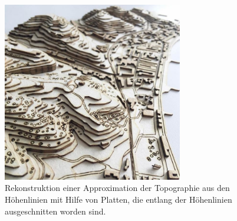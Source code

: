 %
%
%
\begin{figure}
\centering
\includegraphics[width=0.7\textwidth]{chapters/120-topologie/images/relief.jpg}
\caption{Rekonstruktion einer Approximation der Topographie aus den
Höhenlinien mit Hilfe von Platten, die entlang der Höhenlinien ausgeschnitten
worden sind.
\label{buch:topologie:morse:fig:relief}}
\end{figure}
